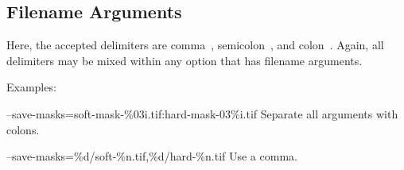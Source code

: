 \subsection[Filename Arguments]{\label{sec:option-delimiters-filename-arguments}%
  Filename Arguments}

Here, the accepted delimiters are comma~\sample{,}, semicolon~\sample{;}, and colon~\sample{:}.
Again, all delimiters may be mixed within any option that has filename arguments.

Examples:

\begin{codelist}
\item[--save-masks=soft-mask-\%03i.tif:hard-mask-03\%i.tif]\itemend
  Separate all arguments with colons.

\item[--save-masks=\%d/soft-\%n.tif,\%d/hard-\%n.tif]\itemend
  Use a comma.
\end{codelist}


